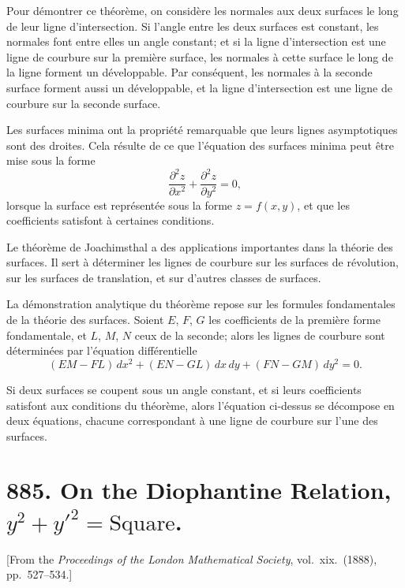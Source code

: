 \documentclass[11pt,a4paper]{book}
\begin{document}
\medskip\noindent
Pour d\'emontrer ce th\'eor\`eme, on consid\`ere les normales aux deux surfaces le long de leur ligne d'intersection. Si l'angle entre les deux surfaces est constant, les normales font entre elles un angle constant; et si la ligne d'intersection est une ligne de courbure sur la premi\`ere surface, les normales \`a cette surface le long de la ligne forment un d\'eveloppable. Par cons\'equent, les normales \`a la seconde surface forment aussi un d\'eveloppable, et la ligne d'intersection est une ligne de courbure sur la seconde surface.

\medskip\noindent
Les surfaces minima ont la propri\'et\'e remarquable que leurs lignes asymptotiques sont des droites. Cela r\'esulte de ce que l'\'equation des surfaces minima peut \^etre mise sous la forme
\[
\frac{\partial^{2}z}{\partial x^{2}} + \frac{\partial^{2}z}{\partial y^{2}} = 0,
\]
lorsque la surface est repr\'esent\'ee sous la forme $z = f(x,y)$, et que les coefficients satisfont \`a certaines conditions.

\medskip\noindent
Le th\'eor\`eme de Joachimsthal a des applications importantes dans la th\'eorie des surfaces. Il sert \`a d\'eterminer les lignes de courbure sur les surfaces de r\'evolution, sur les surfaces de translation, et sur d'autres classes de surfaces.

\medskip\noindent
La d\'emonstration analytique du th\'eor\`eme repose sur les formules fondamentales de la th\'eorie des surfaces. Soient $E$, $F$, $G$ les coefficients de la premi\`ere forme fondamentale, et $L$, $M$, $N$ ceux de la seconde; alors les lignes de courbure sont d\'etermin\'ees par l'\'equation diff\'erentielle
\[
(EM - FL)\,dx^{2} + (EN - GL)\,dx\,dy + (FN - GM)\,dy^{2} = 0.
\]

Si deux surfaces se coupent sous un angle constant, et si leurs coefficients satisfont aux conditions du th\'eor\`eme, alors l'\'equation ci-dessus se d\'ecompose en deux \'equations, chacune correspondant \`a une ligne de courbure sur l'une des surfaces.

\newpage
\section[885]{885. On the Diophantine Relation, $y^{2} + y'^{2} = \text{Square}$.}
\label{sec:885}

[From the \textit{Proceedings of the London Mathematical Society}, vol.\ xix.\ (1888), pp.\ 527--534.]
\end{document}
